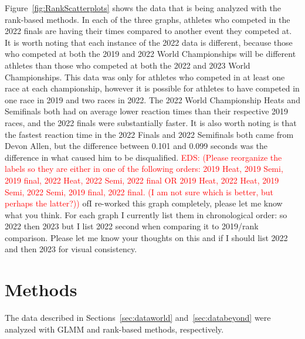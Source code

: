 \documentclass[12pt, letterpaper, titlepage]{article}
\newcommand{\eds}[1]{\textcolor{red}{EDS: (#1)}}
\newcommand{\of}[1]{\textcolor{violet}{OF: #1}}
\begin{document}
Figure~\ref{fig:RankScatterplots} shows the data that is being analyzed
with the rank-based methods.  In each of the three graphs, athletes who competed
in the 2022 finals are having their times compared to another event they competed
at.  It is worth noting that each instance of the 2022 data is different, because
those who competed at both the 2019 and 2022 World Championships will be
different athletes than those who competed at both the 2022 and 2023 World
Championships. This data was only for athletes who competed
in at least one race at each championship, however it is possible for athletes
to have competed in one race in 2019 and two races in 2022.  The 2022 World
Championship Heats and Semifinals both had on average lower reaction times than
their respective 2019 races, and the 2022 finals were substantially faster. It
is also worth noting is that the fastest reaction time in the 2022 Finals and 2022
Semifinals both came from Devon Allen, but the difference between 0.101 and 0.099
seconds was the difference in what caused him to be disqualified. 
\eds{Please reorganize the labels so they are either in one of the following 
orders:
2019 Heat, 2019 Semi, 2019 final, 2022 Heat, 2022 Semi, 2022 final  OR
2019 Heat, 2022 Heat, 2019 Semi, 2022 Semi, 2019 final, 2022 final.  
(I am not sure which is better, but perhaps the latter?)}
of{I re-worked this graph completely, please let me know what you think.  For
each graph I currently list them in chronological order: so 2022 then 2023 but
I list 2022 second when comparing it to 2019/rank comparison.  Please let me
know your thoughts on this and if I should list 2022 and then 2023 for visual
consistency.}




\section{Methods} \label{sec:Methods}

The data described in Sections~\ref{sec:dataworld} and~\ref{sec:databeyond} were
analyzed with GLMM and rank-based methods, respectively.
\end{document}
